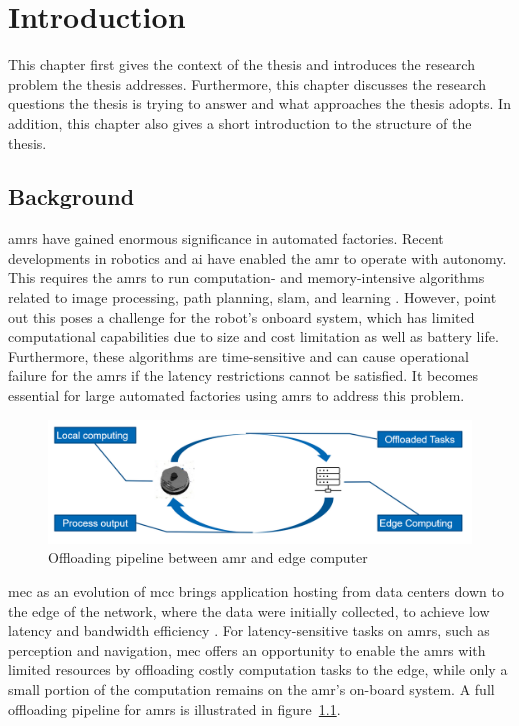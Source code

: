 \chapter{Introduction}

This chapter first gives the context of the thesis and introduces the research problem the thesis addresses. Furthermore, this chapter discusses the research questions the thesis is trying to answer and what approaches the thesis adopts. In addition, this chapter also gives a short introduction to the structure of the thesis.

\section{Background}

\glspl{amr} have gained enormous significance in automated factories. Recent developments in robotics and \gls{ai} have enabled the \gls{amr} to operate with autonomy. This requires the \glspl{amr} to run computation- and memory-intensive algorithms related to image processing, path planning, \gls{slam}, and learning \cite{Saeik2021}. However, \citeauthor*{Baxi2022} point out this poses a challenge for the robot's onboard system, which has limited computational capabilities due to size and cost limitation as well as battery life. Furthermore, these algorithms are time-sensitive and can cause operational failure for the \glspl{amr} if the latency restrictions cannot be satisfied. It becomes essential for large automated factories using \glspl{amr} to address this problem. 


\begin{figure}[htb]
    \centering

    \includegraphics[width=120mm]{figures/setup/amr_offloading.png}
    \caption{Offloading pipeline between \gls{amr} and edge computer}

    \label{fig:amr_offloading}
\end{figure}

\gls{mec} as an evolution of \gls*{mcc} brings application hosting from data centers down to the edge of the network, where the data were initially collected, to achieve low latency and bandwidth efficiency \cite{Lin2019}. For latency-sensitive tasks on \glspl{amr}, such as perception and navigation, \gls{mec} offers an opportunity to enable the \glspl{amr} with limited resources by offloading costly computation tasks to the edge, while only a small portion of the computation remains on the \gls{amr}'s on-board system. A full offloading pipeline for \glspl{amr} is illustrated in figure~\cref{fig:amr_offloading}.


